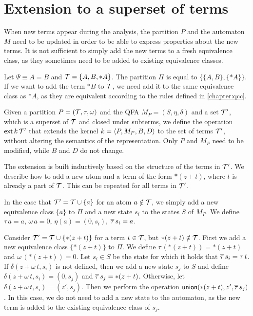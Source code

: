 \section{Extension to a superset of terms}

When new terms appear during the analysis, the partition $P$ and the automaton $M$ need to be updated
in order to be able to express properties about the new terms.
It is not sufficient to simply add the new terms to a fresh equivalence class,
as they sometimes need to be added to existing equivalence classes.

\begin{example}
    Let $\Psi \equiv A = B$ and $\mathcal{T} = \{A, B, *A\}$.
    The partition $\Pi$ is equal to $\{\{A, B\}, \{*A\}\}$.
    If we want to add the term $*B$ to $\mathcal{T}$, we need add it to the same equivalence class as $*A$,
    as they are equivalent according to the rules defined in \cref{chapter:qcc}.
\end{example}

Given a partition $P = (\mathcal{T}, \tau, \omega)$ and the QFA $M_P = (S, \eta, \delta)$ and a set $\mathcal{T}'$, which is a superset of $\mathcal{T}$ and closed under subterms,
we define the operation $\textsf{ext}\,{k}\,{\mathcal{T}'}$ that extends the kernel $k = \langle P, M_P, B, D\rangle$ to the set of terms $\mathcal{T}'$,
without altering the semantics of the representation.
Only $P$ and $M_P$ need to be modified, while $B$ and $D$ do not change.

The extension is built inductively based on the structure of the terms in $\mathcal{T}'$.
We describe how to add a new atom and a term of the form $*(z+t)$, where $t$ is already a part of $\mathcal{T}$.
This can be repeated for all terms in $\mathcal{T}'$.

In the case that $\mathcal{T}' = \mathcal{T} \cup \{a\}$ for an atom $a \notin \mathcal{T}$, we simply add a new
equivalence class $\{a\}$ to $\Pi$ and a new state $s_i$ to the states $S$ of $M_P$.
We define $\tau\,a = a$, $\omega\,a=0$, $\eta(a) = (0,s_i)$, $\overline{\tau}\,s_i = a$.

Consider $\mathcal{T}' = \mathcal{T} \cup \{*(z+t)\}$ for a term $t \in \mathcal{T}$, but $*(z + t) \notin \mathcal{T}$.
First we add a new equivalence class $\{*(z+t)\}$ to $\Pi$.
We define $\tau\,(*(z+t)) = *(z+t)$ and $\omega\,(*(z+t))=0$.
Let $s_i \in S$ be the state for which it holds that $\overline{\tau}\,s_i = \tau\,t$.
If $\delta(z + \omega\,t,s_i)$ is not defined, then we add a new state $s_j$ to $S$
and define $\delta(z + \omega\,t, s_i) = (0, s_j)$ and $\overline{\tau}\,s_j = *(z+t)$.
Otherwise, let $\delta(z + \omega\,t, s_i) = (z', s_j)$.
Then we perform the operation $\textsf{union}(*(z + t), z', \overline{\tau}\,s_j)$.
In this case, we do not need to add a new state to the automaton,
as the new term is added to the existing equivalence class of $s_j$.
